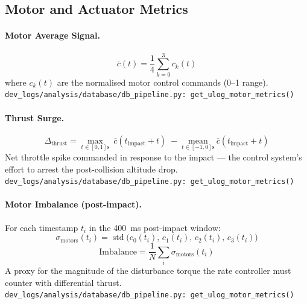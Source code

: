 \subsection{Motor and Actuator Metrics}

\paragraph{Motor Average Signal.}
\begin{equation}
    \overline{c}(t) = \frac{1}{4}\sum_{k=0}^{3} c_k(t)
\end{equation}
where $c_k(t)$ are the normalised motor control commands (0--1 range).\\
\texttt{\small dev\_logs/analysis/database/db\_pipeline.py:\ get\_ulog\_motor\_metrics()}

\medskip
\paragraph{Thrust Surge.}
\begin{equation}
    \Delta_{\text{thrust}} = \max_{t \in [0,1]\text{s}}\ \overline{c}(t_{\text{impact}} + t) \;-\; \underset{t \in [-1,0]\text{s}}{\mathrm{mean}}\ \overline{c}(t_{\text{impact}} + t)
\end{equation}
Net throttle spike commanded in response to the impact --- the control system's effort to arrest the post-collision altitude drop.\\
\texttt{\small dev\_logs/analysis/database/db\_pipeline.py:\ get\_ulog\_motor\_metrics()}

\medskip
\paragraph{Motor Imbalance (post-impact).}
For each timestamp $t_i$ in the 400~ms post-impact window:
\begin{equation}
    \sigma_{\text{motors}}(t_i) = \operatorname{std}\bigl(c_0(t_i),\, c_1(t_i),\, c_2(t_i),\, c_3(t_i)\bigr)
\end{equation}
\begin{equation}
    \mathrm{Imbalance} = \frac{1}{N}\sum_{i} \sigma_{\text{motors}}(t_i)
\end{equation}
A proxy for the magnitude of the disturbance torque the rate controller must counter with differential thrust.\\
\texttt{\small dev\_logs/analysis/database/db\_pipeline.py:\ get\_ulog\_motor\_metrics()}

